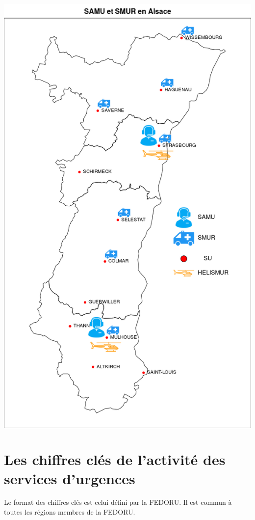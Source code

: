 \documentclass[]{article}
\begin{document}
\includegraphics{3-Contexte/Figs/samu_smur_su.png}

\section{Les chiffres clés de l'activité des services
d'urgences}\label{les-chiffres-cles-de-lactivite-des-services-durgences}

Le format des chiffres clés est celui défini par la FEDORU. Il est
commun à toutes les régions membres de la FEDORU.
\end{document}
